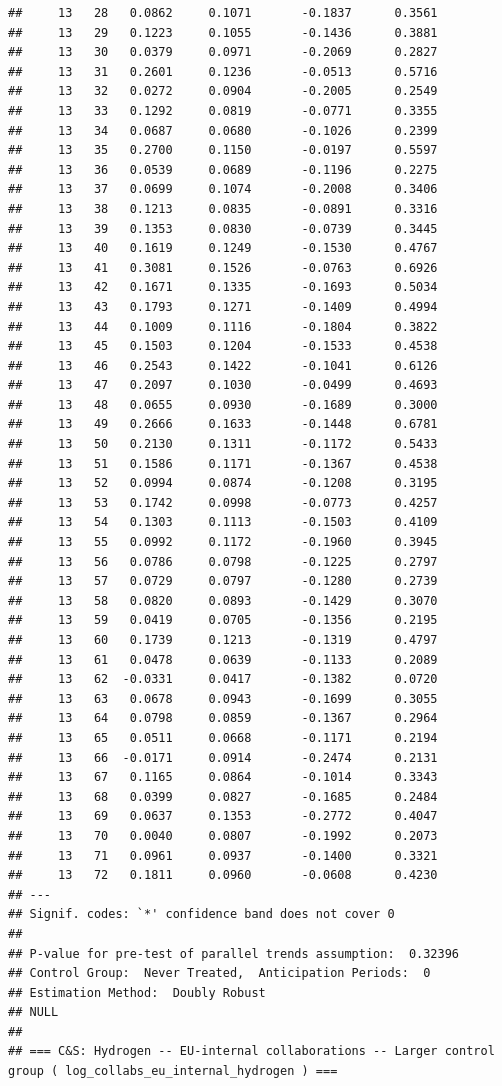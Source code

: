 \documentclass[
]{article}
\begin{document}
\begin{verbatim}
##     13   28   0.0862     0.1071       -0.1837      0.3561 
##     13   29   0.1223     0.1055       -0.1436      0.3881 
##     13   30   0.0379     0.0971       -0.2069      0.2827 
##     13   31   0.2601     0.1236       -0.0513      0.5716 
##     13   32   0.0272     0.0904       -0.2005      0.2549 
##     13   33   0.1292     0.0819       -0.0771      0.3355 
##     13   34   0.0687     0.0680       -0.1026      0.2399 
##     13   35   0.2700     0.1150       -0.0197      0.5597 
##     13   36   0.0539     0.0689       -0.1196      0.2275 
##     13   37   0.0699     0.1074       -0.2008      0.3406 
##     13   38   0.1213     0.0835       -0.0891      0.3316 
##     13   39   0.1353     0.0830       -0.0739      0.3445 
##     13   40   0.1619     0.1249       -0.1530      0.4767 
##     13   41   0.3081     0.1526       -0.0763      0.6926 
##     13   42   0.1671     0.1335       -0.1693      0.5034 
##     13   43   0.1793     0.1271       -0.1409      0.4994 
##     13   44   0.1009     0.1116       -0.1804      0.3822 
##     13   45   0.1503     0.1204       -0.1533      0.4538 
##     13   46   0.2543     0.1422       -0.1041      0.6126 
##     13   47   0.2097     0.1030       -0.0499      0.4693 
##     13   48   0.0655     0.0930       -0.1689      0.3000 
##     13   49   0.2666     0.1633       -0.1448      0.6781 
##     13   50   0.2130     0.1311       -0.1172      0.5433 
##     13   51   0.1586     0.1171       -0.1367      0.4538 
##     13   52   0.0994     0.0874       -0.1208      0.3195 
##     13   53   0.1742     0.0998       -0.0773      0.4257 
##     13   54   0.1303     0.1113       -0.1503      0.4109 
##     13   55   0.0992     0.1172       -0.1960      0.3945 
##     13   56   0.0786     0.0798       -0.1225      0.2797 
##     13   57   0.0729     0.0797       -0.1280      0.2739 
##     13   58   0.0820     0.0893       -0.1429      0.3070 
##     13   59   0.0419     0.0705       -0.1356      0.2195 
##     13   60   0.1739     0.1213       -0.1319      0.4797 
##     13   61   0.0478     0.0639       -0.1133      0.2089 
##     13   62  -0.0331     0.0417       -0.1382      0.0720 
##     13   63   0.0678     0.0943       -0.1699      0.3055 
##     13   64   0.0798     0.0859       -0.1367      0.2964 
##     13   65   0.0511     0.0668       -0.1171      0.2194 
##     13   66  -0.0171     0.0914       -0.2474      0.2131 
##     13   67   0.1165     0.0864       -0.1014      0.3343 
##     13   68   0.0399     0.0827       -0.1685      0.2484 
##     13   69   0.0637     0.1353       -0.2772      0.4047 
##     13   70   0.0040     0.0807       -0.1992      0.2073 
##     13   71   0.0961     0.0937       -0.1400      0.3321 
##     13   72   0.1811     0.0960       -0.0608      0.4230 
## ---
## Signif. codes: `*' confidence band does not cover 0
## 
## P-value for pre-test of parallel trends assumption:  0.32396
## Control Group:  Never Treated,  Anticipation Periods:  0
## Estimation Method:  Doubly Robust
## NULL
## 
## === C&S: Hydrogen -- EU-internal collaborations -- Larger control group ( log_collabs_eu_internal_hydrogen ) ===
\end{verbatim}
\end{document}
